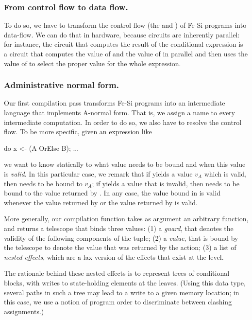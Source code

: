 \documentclass{llncs}
\begin{document}
\subsubsection{From control flow to data flow.}To do so, we have to
transform the control flow (the  and ) of
Fe-Si programs into data-flow.
%
We can do that in hardware, because circuits are inherently parallel:
for instance, the circuit that computes the result of the conditional
expression \mbox{} is a circuit that computes the
value of  and the value of  in parallel and then uses
the value of  to select the proper value for the whole
expression.

\subsubsection{Administrative normal form.} Our first compilation pass
transforms Fe-Si programs into an intermediate language that
implements A-normal form. That is, we assign a name to every
intermediate computation.
%
In order to do so, we also have to resolve the control flow. To be
more specific, given an expression like
\begin{mcoq}
do x <- (A OrElse B); ... 
\end{mcoq}
we want to know statically to what value  needs to be bound
and when this value is \emph{valid}. 
%
In this particular case, we remark that if  yields a value
$v_A$ which is valid, then  needs to be bound to $v_A$; if
 yields a value that is invalid, then  needs to be
bound to the value returned by . In any case, the value bound
in  is valid whenever the value returned by  or the
value returned by  is valid.

More generally, our compilation function takes as argument an
arbitrary function, and returns a telescope that binds three values:
(1) a \emph{guard}, that denotes the validity of the following
components of the tuple; %
(2) a \emph{value}, that is bound by the telescope to denote the value
that was returned by the action; %
(3) a list of \emph{nested effects}, which are a lax version of the
effects that exist at the  level.

The rationale behind these nested effects is to represent trees of
conditional blocks, with writes to state-holding elements at the
leaves. (Using this data type, several paths in such a tree may lead
to a write to a given memory location; in this case, we use a notion
of program order to discriminate between clashing assignments.)
\end{document}
